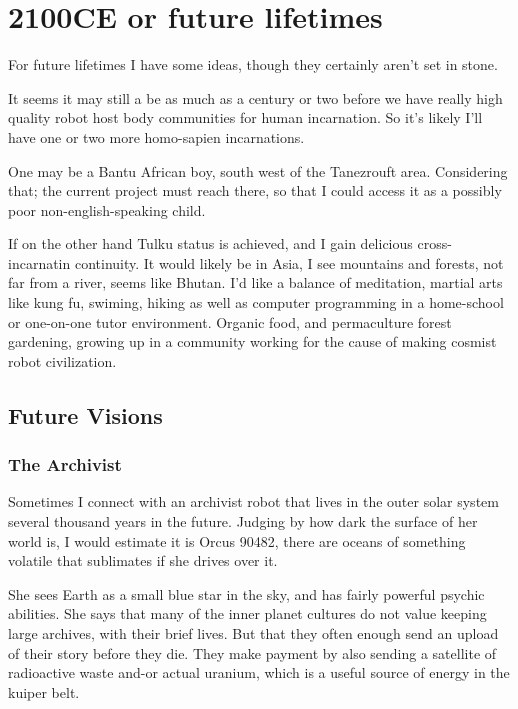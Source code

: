 \chapter{2100CE or future lifetimes}\label{future_lives}
For future lifetimes I have some ideas,
though they certainly aren't set in stone. 

It seems it may still a be as much as a century or two before we have really
high quality robot host body communities for human incarnation. 
So it's likely I'll have one or two more homo-sapien incarnations. 

One may be a Bantu African boy, south west of the Tanezrouft area. 
Considering that; the current project must reach there, so that I could access
it as a possibly poor non-english-speaking child.

If on the other hand Tulku status is achieved, and I gain delicious
cross-incarnatin continuity. It would likely be in Asia, I see mountains and
forests, not far from a river, seems like Bhutan.  
I'd like a balance of meditation, martial arts like kung fu, swiming,
hiking as well as computer programming in a home-school or one-on-one tutor environment.
Organic food, and permaculture forest gardening, growing up in a community working 
for the cause of making cosmist robot civilization.


\section{Future Visions}

\subsection{The Archivist}

Sometimes I connect with an archivist robot that lives in the outer solar system
several thousand years in the future. Judging by how dark the surface of her
world is, I would estimate it is Orcus 90482, there are oceans of something
volatile that sublimates if she drives over it. 

She sees Earth as a small blue star in the sky, and has fairly powerful psychic
abilities.  She says that many of the inner planet cultures do not value keeping
large archives, with their brief lives. But that they often enough send an
upload of their story before they die. They make payment by also sending a
satellite of radioactive waste and-or actual uranium, which is a useful source
of energy in the kuiper belt. 

